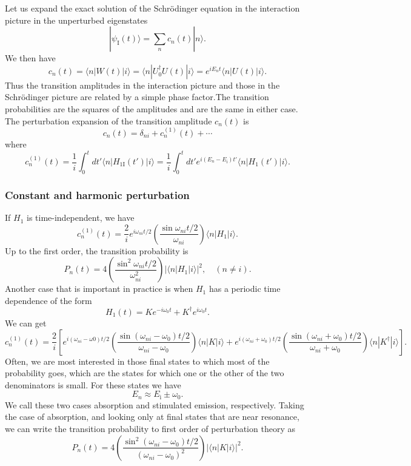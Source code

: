 Let us expand the exact solution of the Schr\"{o}dinger equation in the interaction picture in the unperturbed eigenstates
\[|\psi_{\mathrm{I}}(t)\rangle = \sum_n c_n(t) |n\rangle.\]
We then have
\[c_n(t) = \langle n | W(t) | i\rangle = \langle n | U^{\dagger}_0U(t) | i\rangle = e^{iE_nt} \langle n | U(t) | i\rangle .\]
Thus the transition amplitudes in the interaction picture and those in the Schr\"{o}dinger picture are related by a simple phase factor.The transition probabilities are the squares of the amplitudes and are the same in either case. The perturbation expansion of the transition amplitude $c_n(t)$ is
\[c_n(t) = \delta_{ni} + c^{(1)}_n(t) + \cdots\]
where
\[c^{(1)}_n(t) = \frac{1}{i} \int_0^t dt' \langle n | H_{1\mathrm{I}}(t')|i\rangle = \frac{1}{i} \int_0^t dt' e^{i(E_n-E_{\mathrm{i}})t'} \langle n | H_{1}(t')|i\rangle.\]

\subsubsection{Constant and harmonic perturbation}
If $H_1$ is time-independent, we have
\[c^{(1)}_n(t) = \frac{2}{i} e^{i\omega_{ni}t/2} \left( \frac{\sin\omega_{ni}t/2}{\omega_{ni}} \right) \langle n | H_1 | i \rangle.\]
Up to the first order, the transition probability is
\[P_n(t) = 4 \left( \frac{\sin^2\omega_{ni}t/2}{\omega_{ni}^2} \right) |\langle n | H_1 | i \rangle|^2 , \quad (n \neq i).\]
Another case that is important in practice is when $H_1$ has a periodic time dependence of the form
\[H_1(t) = Ke^{-i\omega_0t} + K^{\dagger}e^{i\omega_0t}.\]
We can get
\[c^{(1)}_n(t) = \frac{2}{i} \left[ e^{i(\omega_{ni}-\omega0)t/2} \left( \frac{\sin(\omega_{ni}-\omega_0)t/2}{\omega_{ni}-\omega_0} \right) \langle n | K | i \rangle  + e^{i(\omega_{ni}+\omega_0)t/2} \left( \frac{\sin(\omega_{ni}+\omega_0)t/2}{\omega_{ni}+\omega_0} \right) \langle n | K^{\dagger} | i \rangle \right]  .\]
Often, we are most interested in those final states to which most of the probability goes, which are the states for which one or the other of the two denominators is small.
For these states we have
\[E_n \approx E_{\mathrm{i}} \pm \omega_0.\]
We call these two cases absorption and stimulated emission, respectively. 
Taking the case of absorption, and looking only at final states that are near resonance, we can write the transition probability to first order of perturbation theory as
\[P_n(t) = 4 \left( \frac{\sin^2(\omega_{ni}-\omega_0)t/2}{(\omega_{ni}-\omega_0)^2} \right) |\langle n | K | i \rangle|^2.\]

